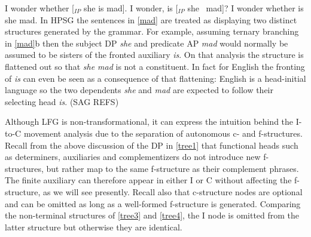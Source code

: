 \documentclass[output=paper
                ,modfonts
                ,nonflat
	        ,collection
	        ,collectionchapter
	        ,collectiontoclongg
 	        ,biblatex
                ,babelshorthands
                ,newtxmath
                ,draftmode
                ,colorlinks, citecolor=brown
]{./langsci/langscibook}
\begin{document}
\eal 
\label{mad2}
\ex  I wonder whether [$_{IP}$ she is mad]. 
\ex  I wonder,  is  [$_{IP}$ she \gap\ mad]?
\ex  *I wonder whether is she mad.
\zl
In HPSG the sentences in \ref{mad} are treated as displaying two distinct structures generated by the grammar.  For example, assuming ternary branching in \ref{mad}b then the subject DP \textit{she} and predicate AP \textit{mad} would normally be assumed to be sisters of the fronted auxiliary \textit{is}.  On that analysis the structure is flattened out so that \textit{she mad} is not a constituent.  In fact for English the fronting of \textit{is} can even be seen as a consequence of that flattening:  English is a head-initial language so the two dependents \textit{she} and \textit{mad} are expected to follow their selecting head \textit{is}.  (SAG REFS)  

Although LFG is non-transformational, it can express the intuition behind the I-to-C movement analysis due to  the separation of autonomous c- and f-structures.  Recall from the above discussion of the DP in \ref{tree1} that functional heads such as determiners, auxiliaries and complementizers do not introduce new f-structures, but rather map to the same f-structure as their complement phrases.   The finite auxiliary can therefore appear in either I or C without affecting the f-structure, as we will see presently.  Recall also that c-structure nodes are optional and can be omitted as long as a well-formed f-structure is generated.  Comparing the non-terminal structures of \ref{tree3} and \ref{tree4}, the I node is omitted from the latter structure but otherwise they are identical.   

\eal 
 \label{tree3} { }
\zl
{}
\end{document}
